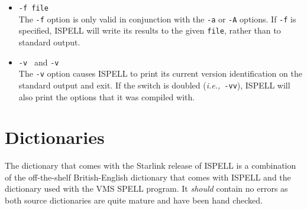 \documentclass[twoside,11pt]{article}
\begin{document}
\begin{itemize}
To summarize these:

\begin{itemize}

   \item \verb+*+ Add to personal dictionary.
   \item \verb+@+ Accept word, but leave out of dictionary.
   \item \verb+#+ Save current personal dictionary.
   \item \verb+~+ Set parameters based on filename.
   \item \verb=+= Enter \TeX\ mode.
   \item \verb+-+ Exit \TeX\ mode.
   \item \verb+!+ Enter terse mode.
   \item \verb+%+ Exit terse mode.
   \item \verb+^+ Spell-check rest of line.

\end{itemize}

In terse mode, ISPELL will not print lines beginning with \verb-*+-, or
\verb+-+, all of which indicate correct words.
This significantly improves running speed when the driving program is going to
ignore correct words anyway.

\item {\Large\tt -f file} \\
The \verb+-f+ option is only valid in conjunction with the \verb+-a+ or
\verb+-A+ options.
If \verb+-f+ is specified, ISPELL will write its results to the given
\verb+file+, rather than to standard output.

\item {\Large\tt -v } and {\Large\tt -v } \\
The \verb+-v+ option causes ISPELL to print its current version identification
on the standard output and exit.
If the switch is doubled ({\it{i.e.,}}\ \verb+-vv+), ISPELL will also print the
options that it was compiled with.

\end{itemize}

\section{Dictionaries}

The dictionary that comes with the Starlink release of ISPELL is a combination
of the off-the-shelf British-English dictionary that comes with ISPELL and the
dictionary used with the VMS SPELL program.  It {\em should} contain no errors
as both source dictionaries are quite mature and have been hand checked.
\end{document}
